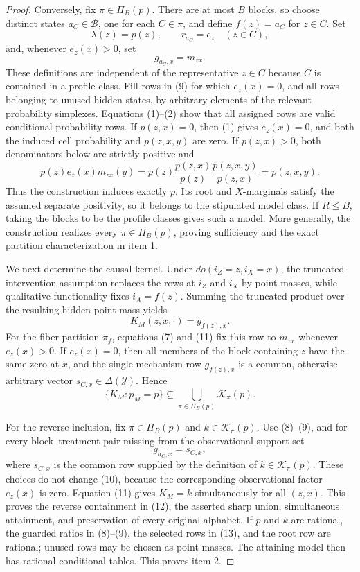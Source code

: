 \documentclass{article}
\begin{document}
\begin{proof}
Conversely, fix \(\pi\in\Pi_B(p)\).  There are at most \(B\) blocks, so
choose distinct states \(a_C\in\mathcal B\), one for each
\(C\in\pi\), and define \(f(z)=a_C\) for \(z\in C\).  Set
\[
 \lambda(z)=p(z),\qquad
 r_{a_C}=e_z\quad(z\in C),
 \tag{8}
\]
and, whenever \(e_z(x)>0\), set
\[
 g_{a_C,x}=m_{zx}.
 \tag{9}
\]
These definitions are independent of the representative \(z\in C\)
because \(C\) is contained in a profile class.  Fill rows in (9) for
which \(e_z(x)=0\), and all rows belonging to unused hidden states, by
arbitrary elements of the relevant probability simplexes.  Equations
(1)--(2) show that all assigned rows are valid conditional probability
rows.  If \(p(z,x)=0\), then (1) gives \(e_z(x)=0\), and both the
induced cell probability and \(p(z,x,y)\) are zero.  If
\(p(z,x)>0\), both denominators below are strictly positive and
\[
 p(z)e_z(x)m_{zx}(y)
 =p(z)\frac{p(z,x)}{p(z)}
       \frac{p(z,x,y)}{p(z,x)}
 =p(z,x,y).
 \tag{10}
\]
Thus the construction induces exactly \(p\).  Its root and
\(X\)-marginals satisfy the assumed separate positivity, so it belongs
to the stipulated model class.  If \(R\leq B\), taking the blocks to be
the profile classes gives such a model.  More generally, the construction
realizes every \(\pi\in\Pi_B(p)\), proving sufficiency and the exact
partition characterization in item 1.

We next determine the causal kernel.  Under
\(do(i_Z=z,i_X=x)\), the truncated-intervention assumption replaces the
rows at \(i_Z\) and \(i_X\) by point masses, while qualitative
functionality fixes \(i_A=f(z)\).  Summing the truncated product over
the resulting hidden point mass yields
\[
 K_M(z,x,\cdot)=g_{f(z),x}.
 \tag{11}
\]
For the fiber partition \(\pi_f\), equations (7) and (11) fix this row
to \(m_{zx}\) whenever \(e_z(x)>0\).  If \(e_z(x)=0\), then all
members of the block containing \(z\) have the same zero at \(x\), and
the single mechanism row \(g_{f(z),x}\) is a common, otherwise arbitrary
vector \(s_{C,x}\in\Delta(\mathcal Y)\).  Hence
\[
 \{K_M:p_M=p\}
 \subseteq \bigcup_{\pi\in\Pi_B(p)}\mathcal K_\pi(p).
 \tag{12}
\]

For the reverse inclusion, fix \(\pi\in\Pi_B(p)\) and
\(k\in\mathcal K_\pi(p)\).  Use (8)--(9), and for every block--treatment
pair missing from the observational support set
\[
 g_{a_C,x}=s_{C,x},
 \tag{13}
\]
where \(s_{C,x}\) is the common row supplied by the definition of
\(k\in\mathcal K_\pi(p)\).  These choices do not change (10), because
the corresponding observational factor \(e_z(x)\) is zero.  Equation
(11) gives \(K_M=k\) simultaneously for all \((z,x)\).  This proves the
reverse containment in (12), the asserted sharp union, simultaneous
attainment, and preservation of every original alphabet.  If \(p\) and
\(k\) are rational, the guarded ratios in (8)--(9), the selected rows in
(13), and the root row are rational; unused rows may be chosen as point
masses.  The attaining model then has rational conditional tables.  This
proves item 2.


\end{proof}
\end{document}
